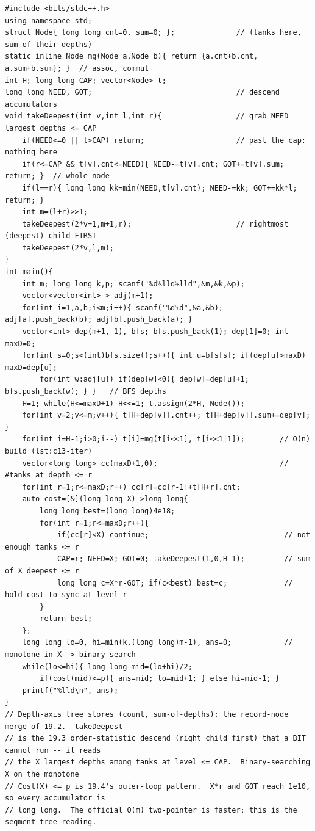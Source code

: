 \begin{lstlisting}[caption={CF 414D: a depth-axis (count,sum) record tree, an order-statistic descend for the X deepest, wrapped in a binary search on the answer}, label={lst:c13-summit}]
#include <bits/stdc++.h>
using namespace std;
struct Node{ long long cnt=0, sum=0; };              // (tanks here, sum of their depths)
static inline Node mg(Node a,Node b){ return {a.cnt+b.cnt, a.sum+b.sum}; }  // assoc, commut
int H; long long CAP; vector<Node> t;
long long NEED, GOT;                                 // descend accumulators
void takeDeepest(int v,int l,int r){                 // grab NEED largest depths <= CAP
    if(NEED<=0 || l>CAP) return;                     // past the cap: nothing here
    if(r<=CAP && t[v].cnt<=NEED){ NEED-=t[v].cnt; GOT+=t[v].sum; return; }  // whole node
    if(l==r){ long long kk=min(NEED,t[v].cnt); NEED-=kk; GOT+=kk*l; return; }
    int m=(l+r)>>1;
    takeDeepest(2*v+1,m+1,r);                        // rightmost (deepest) child FIRST
    takeDeepest(2*v,l,m);
}
int main(){
    int m; long long k,p; scanf("%d%lld%lld",&m,&k,&p);
    vector<vector<int> > adj(m+1);
    for(int i=1,a,b;i<m;i++){ scanf("%d%d",&a,&b); adj[a].push_back(b); adj[b].push_back(a); }
    vector<int> dep(m+1,-1), bfs; bfs.push_back(1); dep[1]=0; int maxD=0;
    for(int s=0;s<(int)bfs.size();s++){ int u=bfs[s]; if(dep[u]>maxD) maxD=dep[u];
        for(int w:adj[u]) if(dep[w]<0){ dep[w]=dep[u]+1; bfs.push_back(w); } }   // BFS depths
    H=1; while(H<=maxD+1) H<<=1; t.assign(2*H, Node());
    for(int v=2;v<=m;v++){ t[H+dep[v]].cnt++; t[H+dep[v]].sum+=dep[v]; }
    for(int i=H-1;i>0;i--) t[i]=mg(t[i<<1], t[i<<1|1]);        // O(n) build (lst:c13-iter)
    vector<long long> cc(maxD+1,0);                            // #tanks at depth <= r
    for(int r=1;r<=maxD;r++) cc[r]=cc[r-1]+t[H+r].cnt;
    auto cost=[&](long long X)->long long{
        long long best=(long long)4e18;
        for(int r=1;r<=maxD;r++){
            if(cc[r]<X) continue;                               // not enough tanks <= r
            CAP=r; NEED=X; GOT=0; takeDeepest(1,0,H-1);         // sum of X deepest <= r
            long long c=X*r-GOT; if(c<best) best=c;             // hold cost to sync at level r
        }
        return best;
    };
    long long lo=0, hi=min(k,(long long)m-1), ans=0;            // monotone in X -> binary search
    while(lo<=hi){ long long mid=(lo+hi)/2;
        if(cost(mid)<=p){ ans=mid; lo=mid+1; } else hi=mid-1; }
    printf("%lld\n", ans);
}
// Depth-axis tree stores (count, sum-of-depths): the record-node merge of 19.2.  takeDeepest
// is the 19.3 order-statistic descend (right child first) that a BIT cannot run -- it reads
// the X largest depths among tanks at level <= CAP.  Binary-searching X on the monotone
// Cost(X) <= p is 19.4's outer-loop pattern.  X*r and GOT reach 1e10, so every accumulator is
// long long.  The official O(m) two-pointer is faster; this is the segment-tree reading.
\end{lstlisting}

